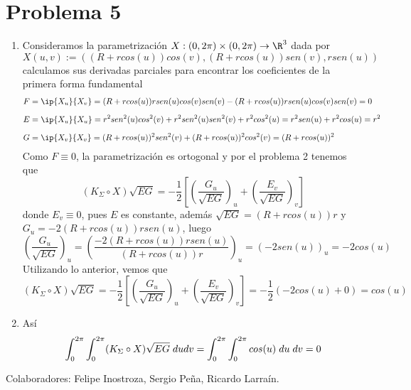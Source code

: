 \documentclass{article}
\begin{document}
\section*{Problema 5}
\begin{enumerate}
    \item Consideramos la parametrización $X:(0,2\pi)\times(0,2\pi)\to\R^{3}$ dada por
    \begin{equation*}
        X(u,v):=((R+rcos(u))cos(v),(R+rcos(u))sen(v),rsen(u))
    \end{equation*}
    calculamos sus derivadas parciales para encontrar los coeficientes de la primera forma 
    fundamental
    \begin{align*}
        F &= \ip{X_{u}}{X_{v}}=(R+rcos(u))rsen(u)cos(v)sen(v)-(R+rcos(u))rsen(u)cos(v)sen(v)=0 
        \\[2mm]
        E &= \ip{X_{u}}{X_{u}}=r^{2}sen^{2}(u)cos^{2}(v)+r^{2}sen^{2}(u)sen^{2}(v)+r^{2}cos^{2}(u)
        =r^{2}sen(u)+r^{2}cos(u)=r^{2} \\[2mm]
        G &= \ip{X_{v}}{X_{v}}=(R+rcos(u))^{2}sen^{2}(v)+(R+rcos(u))^{2}cos^{2}(v)=(R+rcos(u))^{2}
    \end{align*}
    Como $F\equiv0$, la parametrización es ortogonal y por el problema 2 tenemos que
    \begin{equation*}
        (K_{\Sigma}\circ X)\sqrt{EG}=-\frac{1}{2}\left[\left(\frac{G_{u}}{\sqrt{EG}}\right)_{u}
        +\left(\frac{E_{v}}{\sqrt{EG}}\right)_{v}\right]
    \end{equation*}
    donde $E_{v}\equiv0$, pues $E$ es constante, además $\sqrt{EG}=(R+rcos(u))r$ y $G_{u}
    =-2(R+rcos(u))rsen(u)$, luego
    \begin{equation*}
        \left(\frac{G_{u}}{\sqrt{EG}}\right)_{u}=\left(\frac{-2(R+rcos(u))rsen(u)}{(R+rcos(u))r}
        \right)_{u}=(-2sen(u))_{u}=-2cos(u)
    \end{equation*}
    Utilizando lo anterior, vemos que
    \begin{equation*}
        (K_{\Sigma}\circ X)\sqrt{EG}=-\frac{1}{2}\left[\left(\frac{G_{u}}{\sqrt{EG}}\right)_{u}
        +\left(\frac{E_{v}}{\sqrt{EG}}\right)_{v}\right]=-\frac{1}{2}(-2cos(u)+0)=cos(u)
    \end{equation*}

    \item Así
    \begin{equation*}
        \int_{0}^{2\pi}\int_{0}^{2\pi}(K_{\Sigma}\circ X)\sqrt{EG}\hspace{1mm}dudv
        =\int_{0}^{2\pi}\int_{0}^{2\pi}cos(u)\hspace{1mm}du\hspace{1mm}dv=0
    \end{equation*}
\end{enumerate}

\noindent Colaboradores: Felipe Inostroza, Sergio Peña, Ricardo Larraín.

\end{document}

